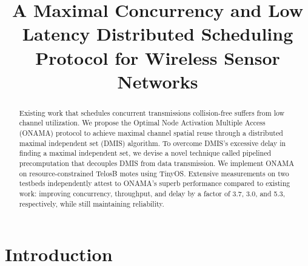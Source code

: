 \documentclass[conference]{IEEEtran}
\begin{document}
\title{A Maximal Concurrency and Low Latency Distributed Scheduling Protocol for Wireless Sensor Networks}

\author{
\and
{}
}














\maketitle


\begin{abstract}
Existing work that schedules concurrent transmissions collision-free suffers from low channel utilization. We propose the Optimal Node Activation Multiple Access (ONAMA) protocol to achieve maximal channel spatial reuse through a distributed maximal independent set (DMIS) algorithm. To overcome DMIS's excessive delay in finding a maximal independent set, we devise a novel technique called pipelined precomputation that decouples DMIS from data transmission. We implement ONAMA on resource-constrained TelosB motes using TinyOS. Extensive measurements on two testbeds independently attest to ONAMA's superb performance 
compared to existing work: improving concurrency, throughput, and delay by a factor of 3.7, 3.0, and 5.3, respectively, while still maintaining reliability.
\end{abstract}









\section{Introduction}
\end{document}
